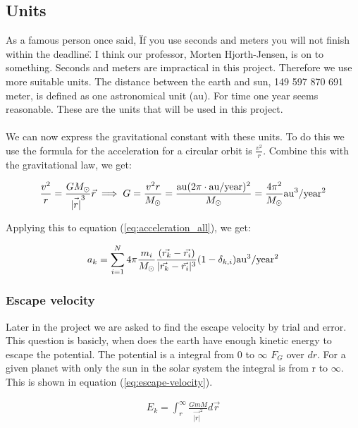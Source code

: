 \subsection{Units}\label{sec:units}
As a famous person once said, \"If you use seconds and meters you will not finish within the deadline\". I think our professor, Morten Hjorth-Jensen, is on to something. Seconds and meters are impractical in this project. Therefore we use more suitable units. The distance between the earth and sun, 149 597 870 691 meter, is defined as one astronomical unit (au). For time one year seems reasonable. 
These are the units that will be used in this project. 
\\
\\
We can now express the gravitational constant with these units. To do this we use the formula for the acceleration for a circular orbit is $\frac{v^2}{r}$. Combine this with the gravitational law, we get: 

\begin{align*}
	\frac{v^2}{r} =
	\frac{GM_{\odot}}{\vec{|r|}^3}\vec{r} 
	\implies 
	G
	=
	\frac{v^2 r}{M_{\odot}} = \frac{\rm{au} (2\pi \cdot \rm{au/year})^2}{M_{\odot}}
	=
	\frac{4\pi^2}
	{M_{\odot}} \rm{au^3/year^2}
\end{align*}

Applying this to equation (\ref{eq:acceleration_all}), we get: 

\begin{align}
	a_k
	=
	\sum_{i = 1}^{N}
	4 \pi \frac{m_i}{M_{\odot}}
	\frac{(\vec{r_k} - \vec{r_i})}
	{|\vec{r_k} - \vec{r_i}|^3}
	(1 - \delta_{k,i}) \rm{au^3/year^2}
	\label{eq:acceleration_all_au}
\end{align}


\subsubsection{Escape velocity}\label{sec:escape-velocity}

Later in the project we are asked to find the escape velocity by trial and error. This question is basicly, when does the earth have enough kinetic energy to escape the potential. The potential is a integral from 0 to $\infty$ $F_G$ over $dr$. For a given planet with only the sun in the solar system the integral is from r to $\infty$. This is shown in equation (\ref{eq:escape-velocity}).  


\begin{align}
E_k =\int_r^\infty \frac{GmM}{\vec{|r|}^2} d\vec{r}\\
\label{eq:escape-velocity}
\end{align}

